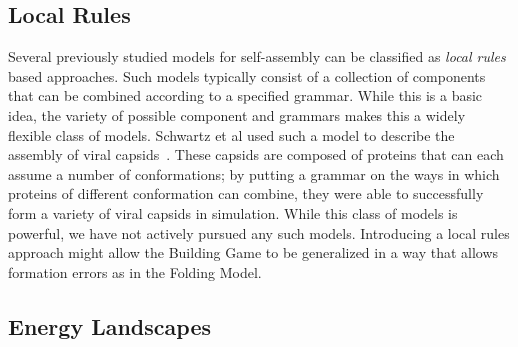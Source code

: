 


\subsection{Local Rules}

Several previously studied models for self-assembly can be classified as \textit{local rules} based approaches. Such models typically consist of a collection of components that can be combined according to a specified grammar. While this is a basic idea, the variety of possible component and grammars makes this a widely flexible class of models. Schwartz et al used such a model to describe the assembly of viral capsids~\cite{Berger1994, Schwartz1998}. These capsids are composed of proteins that can each assume a number of conformations; by putting a grammar on the ways in which proteins of different conformation can combine, they were able to successfully form a variety of viral capsids in simulation. While this class of models is powerful, we have not actively pursued any such models. Introducing a local rules approach might allow the Building Game to be generalized in a way that allows formation errors as in the Folding Model.    


\subsection{Energy Landscapes}


